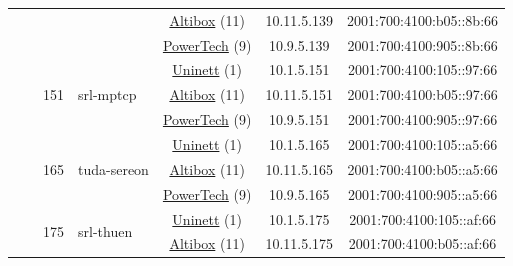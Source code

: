 \begin{small}
\begin{center}
\begin{longtable}{|c|c|c|c|c|c|c|c|}
  &  &  &  & \multicolumn{2}{|c|}{\tiny{\href{https://www.altibox.no}{Altibox} (11)}} & \tiny{10.11.5.139} & \tiny{2001:700:4100:b05::8b:66} \\* \cline{5-5}\cline{6-6}\cline{7-7}\cline{8-8}
  &  &  &  & \multicolumn{2}{|c|}{\tiny{\href{http://www.powertech.no}{PowerTech} (9)}} & \tiny{10.9.5.139} & \tiny{2001:700:4100:905::8b:66} \\* \cline{3-3}\cline{4-4}\cline{5-5}\cline{6-6}\cline{7-7}\cline{8-8}
  &  & \multirow{3}{*}{\tiny{151}} & \multicolumn{1}{|l|}{\multirow{3}{*}{\tiny{srl-mptcp}}} & \multicolumn{2}{|c|}{\tiny{\href{https://www.uninett.no}{Uninett} (1)}} & \tiny{10.1.5.151} & \tiny{2001:700:4100:105::97:66} \\* \cline{5-5}\cline{6-6}\cline{7-7}\cline{8-8}
  &  &  &  & \multicolumn{2}{|c|}{\tiny{\href{https://www.altibox.no}{Altibox} (11)}} & \tiny{10.11.5.151} & \tiny{2001:700:4100:b05::97:66} \\* \cline{5-5}\cline{6-6}\cline{7-7}\cline{8-8}
  &  &  &  & \multicolumn{2}{|c|}{\tiny{\href{http://www.powertech.no}{PowerTech} (9)}} & \tiny{10.9.5.151} & \tiny{2001:700:4100:905::97:66} \\* \cline{3-3}\cline{4-4}\cline{5-5}\cline{6-6}\cline{7-7}\cline{8-8}
  &  & \multirow{3}{*}{\tiny{165}} & \multicolumn{1}{|l|}{\multirow{3}{*}{\tiny{tuda-sereon}}} & \multicolumn{2}{|c|}{\tiny{\href{https://www.uninett.no}{Uninett} (1)}} & \tiny{10.1.5.165} & \tiny{2001:700:4100:105::a5:66} \\* \cline{5-5}\cline{6-6}\cline{7-7}\cline{8-8}
  &  &  &  & \multicolumn{2}{|c|}{\tiny{\href{https://www.altibox.no}{Altibox} (11)}} & \tiny{10.11.5.165} & \tiny{2001:700:4100:b05::a5:66} \\* \cline{5-5}\cline{6-6}\cline{7-7}\cline{8-8}
  &  &  &  & \multicolumn{2}{|c|}{\tiny{\href{http://www.powertech.no}{PowerTech} (9)}} & \tiny{10.9.5.165} & \tiny{2001:700:4100:905::a5:66} \\* \cline{3-3}\cline{4-4}\cline{5-5}\cline{6-6}\cline{7-7}\cline{8-8}
  &  & \multirow{3}{*}{\tiny{175}} & \multicolumn{1}{|l|}{\multirow{3}{*}{\tiny{srl-thuen}}} & \multicolumn{2}{|c|}{\tiny{\href{https://www.uninett.no}{Uninett} (1)}} & \tiny{10.1.5.175} & \tiny{2001:700:4100:105::af:66} \\* \cline{5-5}\cline{6-6}\cline{7-7}\cline{8-8}
  &  &  &  & \multicolumn{2}{|c|}{\tiny{\href{https://www.altibox.no}{Altibox} (11)}} & \tiny{10.11.5.175} & \tiny{2001:700:4100:b05::af:66} \\* \cline{5-5}\cline{6-6}\cline{7-7}\cline{8-8}

\end{longtable}
\end{center}
\end{small}
